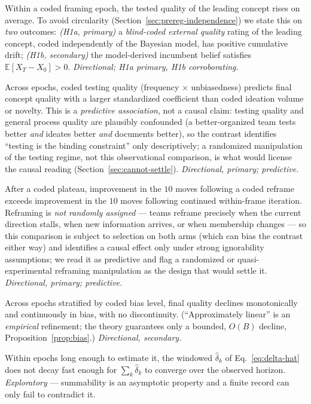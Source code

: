 \documentclass[11pt]{article}
\newcommand{\E}{\mathbb{E}}
\begin{document}
\begin{description}[leftmargin=2.6em, style=nextline, itemsep=3pt]
\item[H1 (Drift).] Within a coded framing epoch, the tested quality of the leading concept rises on average. To avoid circularity (Section~\ref{sec:prereg-independence}) we state this on \emph{two} outcomes: \emph{(H1a, primary)} a \emph{blind-coded external quality} rating of the leading concept, coded independently of the Bayesian model, has positive cumulative drift; \emph{(H1b, secondary)} the model-derived incumbent belief satisfies $\E[X_{T}-X_{0}]>0$. \emph{Directional; H1a primary, H1b corroborating.}
\item[H2 (Testing predicts outcomes above ideation).] Across epochs, coded testing quality (frequency $\times$ unbiasedness) predicts final concept quality with a larger standardized coefficient than coded ideation volume or novelty. This is a \emph{predictive association}, not a causal claim: testing quality and general process quality are plausibly confounded (a better-organized team tests better \emph{and} ideates better \emph{and} documents better), so the contrast identifies ``testing is the binding constraint'' only descriptively; a randomized manipulation of the testing regime, not this observational comparison, is what would license the causal reading (Section~\ref{sec:cannot-settle}). \emph{Directional, primary; predictive.}
\item[H3 (Reframing, not iteration, escapes plateaus).] After a coded plateau, improvement in the $10$ moves following a coded reframe exceeds improvement in the $10$ moves following continued within-frame iteration. Reframing is \emph{not randomly assigned} --- teams reframe precisely when the current direction stalls, when new information arrives, or when membership changes --- so this comparison is subject to selection on both arms (which can bias the contrast either way) and identifies a causal effect only under strong ignorability assumptions; we read it as predictive and flag a randomized or quasi-experimental reframing manipulation as the design that would settle it. \emph{Directional, primary; predictive.}
\item[H4 (Graceful degradation).] Across epochs stratified by coded bias level, final quality declines monotonically and continuously in bias, with no discontinuity. (``Approximately linear'' is an \emph{empirical} refinement; the theory guarantees only a bounded, $O(B)$ decline, Proposition~\ref{prop:bias}.) \emph{Directional, secondary.}
\item[H5 (Generativity is non-summable).] Within epochs long enough to estimate it, the windowed $\hat\delta_k$ of Eq.~\eqref{eq:delta-hat} does not decay fast enough for $\sum_k\hat\delta_k$ to converge over the observed horizon. \emph{Exploratory} --- summability is an asymptotic property and a finite record can only fail to contradict it.
\end{description}
\end{document}
